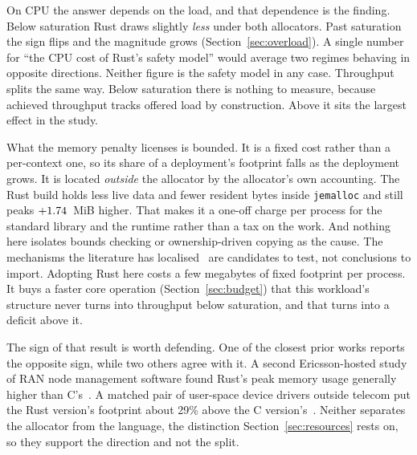 \documentclass[english,oneside,a4paper,censored,csm,software-track-2020]{HYthesisML}
\begin{document}
On CPU the answer depends on the load, and that dependence is the finding. Below saturation Rust
draws slightly \emph{less} under both allocators. Past saturation the sign flips and the
magnitude grows (Section~\ref{sec:overload}). A single number for ``the CPU cost of Rust's
safety model'' would average two regimes behaving in opposite directions. Neither figure is the
safety model in any case. Throughput splits the same way. Below saturation there is nothing to
measure, because achieved throughput tracks offered load by construction. Above it sits the
largest effect in the study.

What the memory penalty licenses is bounded. It is a fixed cost rather than a per-context one,
so its share of a deployment's footprint falls as the deployment grows. It is located \emph{outside} the allocator by the allocator's own accounting. The Rust build holds less live data and fewer resident bytes inside \texttt{jemalloc} and
still peaks $+1.74$~MiB higher. That makes it a one-off charge per process for the
standard library and the runtime rather than a tax on the work. And nothing here isolates bounds checking or ownership-driven copying as the cause.
The mechanisms the literature has localised~\cite{zhang2022runtime,harris2023morello} are
candidates to test, not conclusions to import. Adopting Rust here costs a few megabytes of fixed footprint per process. It buys a faster core
operation (Section~\ref{sec:budget}) that this workload's structure never turns into throughput
below saturation, and that turns into a deficit above it.

The sign of that result is worth defending. One of the closest prior works reports the opposite
sign, while two others agree with it. A second Ericsson-hosted study of RAN node management
software found Rust's peak memory usage generally higher than C's~\cite{olsson2023ranmgmt}. A
matched pair of user-space device drivers outside telecom put the Rust version's footprint about
29\% above the C version's~\cite{sundvisson2026drivers}. Neither separates the allocator from the
language, the distinction Section~\ref{sec:resources} rests on, so they support the direction
and not the split.
\end{document}

